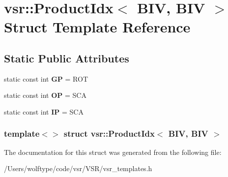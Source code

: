 \hypertarget{structvsr_1_1_product_idx_3_01_b_i_v_00_01_b_i_v_01_4}{\section{vsr\-:\-:Product\-Idx$<$ B\-I\-V, B\-I\-V $>$ Struct Template Reference}
\label{structvsr_1_1_product_idx_3_01_b_i_v_00_01_b_i_v_01_4}
}
\subsection*{Static Public Attributes}
\begin{DoxyCompactItemize}
\item 
\hypertarget{structvsr_1_1_product_idx_3_01_b_i_v_00_01_b_i_v_01_4_a41a1352739ffc02f719aec7bc9db4a33}{static const int {\bfseries G\-P} = R\-O\-T}\label{structvsr_1_1_product_idx_3_01_b_i_v_00_01_b_i_v_01_4_a41a1352739ffc02f719aec7bc9db4a33}

\item 
\hypertarget{structvsr_1_1_product_idx_3_01_b_i_v_00_01_b_i_v_01_4_a741cc58377fbb567887a6dbab8fa9c96}{static const int {\bfseries O\-P} = S\-C\-A}\label{structvsr_1_1_product_idx_3_01_b_i_v_00_01_b_i_v_01_4_a741cc58377fbb567887a6dbab8fa9c96}

\item 
\hypertarget{structvsr_1_1_product_idx_3_01_b_i_v_00_01_b_i_v_01_4_ac86fbb40a2cac5921912cb8d7d0f8e8b}{static const int {\bfseries I\-P} = S\-C\-A}\label{structvsr_1_1_product_idx_3_01_b_i_v_00_01_b_i_v_01_4_ac86fbb40a2cac5921912cb8d7d0f8e8b}

\end{DoxyCompactItemize}
\subsubsection*{template$<$$>$ struct vsr\-::\-Product\-Idx$<$ B\-I\-V, B\-I\-V $>$}



The documentation for this struct was generated from the following file\-:\begin{DoxyCompactItemize}
\item 
/\-Users/wolftype/code/vsr/\-V\-S\-R/vsr\-\_\-templates.\-h\end{DoxyCompactItemize}
